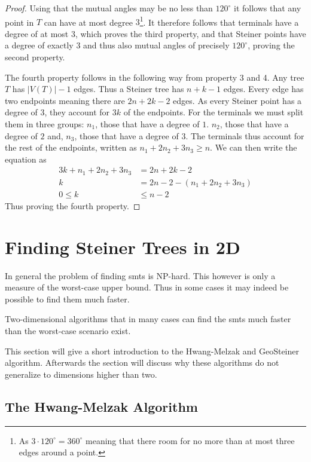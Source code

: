 \begin{proof}
  Using that the mutual angles may be no less than $120^{\circ}$ it follows that
  any point in $T$ can have at most degree $3$\footnote{As $3 \cdot 120^{\circ}
    = 360^{\circ}$ meaning that there room for no more than at most three edges
    around a point.}. It therefore follows that terminals have a degree of at
  most $3$, which proves the third property, and that Steiner points have a
  degree of exactly $3$ and thus also mutual angles of precisely $120^{\circ}$,
  proving the second property.

  The fourth property follows in the following way from property 3 and 4. Any tree
  $T$ has $|V(T)|-1$ edges. Thus a Steiner tree has $n+k-1$ edges.  Every edge has
  two endpoints meaning there are $2 n + 2 k - 2$ edges. As every Steiner point
  has a degree of $3$, they account for $3 k$ of the endpoints. For the terminals
  we must split them in three groups: $n_1$, those that have a degree of
  $1$. $n_2$, those that have a degree of $2$ and, $n_3$, those that have a degree
  of $3$. The terminals thus account for the rest of the endpoints, written as
  $n_1 + 2 n_2 + 3 n_3 \ge n$. We can then write the equation as
  \begin{align}
    \label{eq:22}
    3 k + n_1 + 2 n_2 + 3 n_3 &= 2 n + 2 k - 2 \\
    k &= 2 n - 2 - (n_1 + 2 n_2 + 3 n_3) \\
    0 \le k &\le n - 2
  \end{align}
  Thus proving the fourth property.
\end{proof}

\section{Finding Steiner Trees in 2D}
\label{sec:find-stein-trees-2}

In general the problem of finding \acp{smt} is NP-hard. This however is only a
measure of the worst-case upper bound. Thus in some cases it may indeed be
possible to find them much faster.

Two-dimensional algorithms that in many cases can find the \acp{smt} much
faster than the worst-case scenario exist.

This section will give a short introduction to the Hwang-Melzak and GeoSteiner
algorithm. Afterwards the section will discuss why these algorithms do not
generalize to dimensions higher than two.

\subsection{The Hwang-Melzak Algorithm}
\label{sec:hwang-melz-algor}


